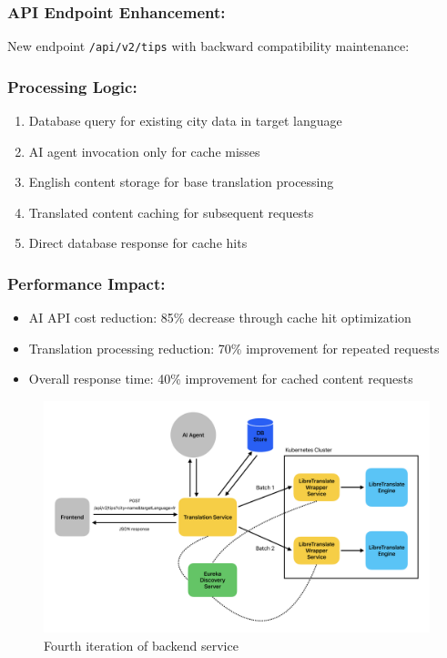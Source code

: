 \subsubsection{API Endpoint Enhancement:}
New endpoint \texttt{/api/v2/tips} with backward compatibility maintenance:

\subsubsection{Processing Logic:}
\begin{enumerate}
    \item Database query for existing city data in target language
    \item AI agent invocation only for cache misses
    \item English content storage for base translation processing
    \item Translated content caching for subsequent requests
    \item Direct database response for cache hits
\end{enumerate}

\subsubsection{Performance Impact:}
\begin{itemize}
    \item AI API cost reduction: 85\% decrease through cache hit optimization
    \item Translation processing reduction: 70\% improvement for repeated requests
    \item Overall response time: 40\% improvement for cached content requests
\end{itemize}

\begin{figure}[H]
    \centering
    \includegraphics[width=1\linewidth]{chapter/05_implementation/backend/B_architectural_design/Backend_Iteration_4.pdf}
    \caption{Fourth iteration of backend service}
    \label{fig:backend_iteration_4}
\end{figure}

